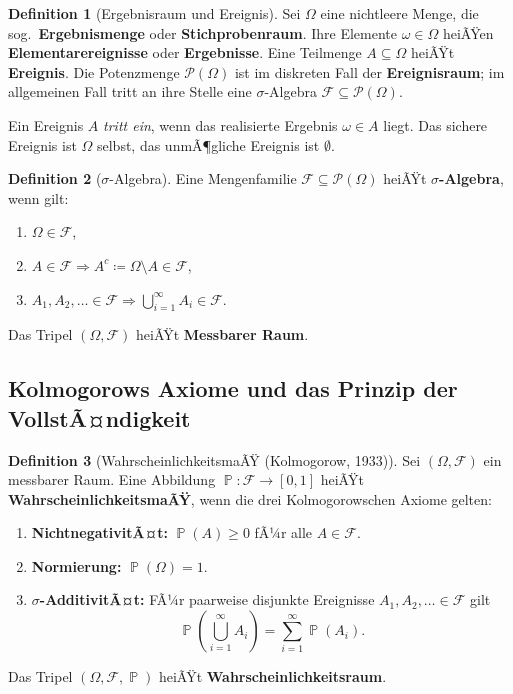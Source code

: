 ﻿\documentclass[12pt,a4paper]{article}
\theoremstyle{definition}
\newtheorem{definition}{Definition}[section]
\theoremstyle{plain}
\theoremstyle{remark}
\DeclareMathOperator{\Prob}{\mathbb{P}}
\begin{document}
\begin{definition}[Ergebnisraum und Ereignis]\label{def:ergebnisraum}
  Sei $\Omega$ eine nichtleere Menge, die sog.\ \textbf{Ergebnismenge} oder
  \textbf{Stichprobenraum}. Ihre Elemente $\omega \in \Omega$ heiÃŸen
  \textbf{Elementarereignisse} oder \textbf{Ergebnisse}. Eine Teilmenge
  $A \subseteq \Omega$ heiÃŸt \textbf{Ereignis}. Die Potenzmenge
  $\mathcal{P}(\Omega)$ ist im diskreten Fall der \textbf{Ereignisraum};
  im allgemeinen Fall tritt an ihre Stelle eine $\sigma$-Algebra
  $\mathcal{F} \subseteq \mathcal{P}(\Omega)$.
\end{definition}

Ein Ereignis $A$ \emph{tritt ein}, wenn das realisierte Ergebnis
$\omega \in A$ liegt. Das sichere Ereignis ist $\Omega$ selbst, das
unmÃ¶gliche Ereignis ist $\emptyset$.

\begin{definition}[$\sigma$-Algebra]\label{def:sigma-algebra}
  Eine Mengenfamilie $\mathcal{F} \subseteq \mathcal{P}(\Omega)$ heiÃŸt
  \textbf{$\sigma$-Algebra}, wenn gilt:
  \begin{enumerate}[label=(\roman*)]
    \item $\Omega \in \mathcal{F}$,
    \item $A \in \mathcal{F} \Rightarrow A^c \coloneqq \Omega \setminus A \in \mathcal{F}$,
    \item $A_1, A_2, \ldots \in \mathcal{F} \Rightarrow \bigcup_{i=1}^{\infty} A_i \in \mathcal{F}$.
  \end{enumerate}
  Das Tripel $(\Omega, \mathcal{F})$ heiÃŸt \textbf{Messbarer Raum}.
\end{definition}

\subsection{Kolmogorows Axiome und das Prinzip der VollstÃ¤ndigkeit}
\label{subsec:axiome}

\begin{definition}[WahrscheinlichkeitsmaÃŸ (Kolmogorow, 1933)]\label{def:wmaÃŸ}
  Sei $(\Omega, \mathcal{F})$ ein messbarer Raum. Eine Abbildung
  $\Prob\colon \mathcal{F} \to [0,1]$ heiÃŸt \textbf{WahrscheinlichkeitsmaÃŸ},
  wenn die drei Kolmogorowschen Axiome gelten:
  \begin{enumerate}[label=\textbf{(K\arabic*)}]
    \item \textbf{NichtnegativitÃ¤t:} $\Prob(A) \geq 0$ fÃ¼r alle $A \in \mathcal{F}$.
    \item \textbf{Normierung:} $\Prob(\Omega) = 1$.
    \item \textbf{$\sigma$-AdditivitÃ¤t:} FÃ¼r paarweise disjunkte Ereignisse
      $A_1, A_2, \ldots \in \mathcal{F}$ gilt
      \[
        \Prob\!\left(\bigcup_{i=1}^{\infty} A_i\right) = \sum_{i=1}^{\infty} \Prob(A_i).
      \]
  \end{enumerate}
  Das Tripel $(\Omega, \mathcal{F}, \Prob)$ heiÃŸt \textbf{Wahrscheinlichkeitsraum}.
\end{definition}
\end{document}
